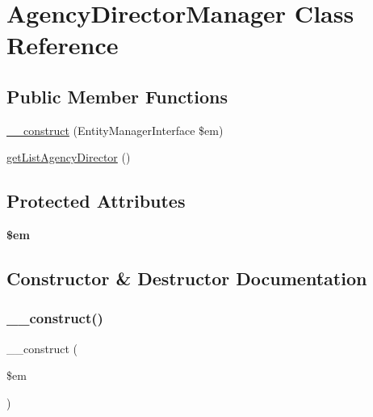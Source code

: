 \hypertarget{class_app_1_1_b_l_1_1_agency_director_manager}{}\section{Agency\+Director\+Manager Class Reference}
\label{class_app_1_1_b_l_1_1_agency_director_manager}
\subsection*{Public Member Functions}
\begin{DoxyCompactItemize}
\item 
\mbox{\hyperlink{class_app_1_1_b_l_1_1_agency_director_manager_a25f4258aeb5ce2a61a2504cb7c058485}{\+\_\+\+\_\+construct}} (Entity\+Manager\+Interface \$em)
\item 
\mbox{\hyperlink{class_app_1_1_b_l_1_1_agency_director_manager_a267bd33e4c994768e98c18ff7ace416e}{get\+List\+Agency\+Director}} ()
\end{DoxyCompactItemize}
\subsection*{Protected Attributes}
\begin{DoxyCompactItemize}
\item 
\mbox{\label{class_app_1_1_b_l_1_1_agency_director_manager_a0f2991d5fed029ef50ef619f1a532d06}} 
{\bfseries \$em}
\end{DoxyCompactItemize}


\subsection{Constructor \& Destructor Documentation}
\mbox{\label{class_app_1_1_b_l_1_1_agency_director_manager_a25f4258aeb5ce2a61a2504cb7c058485}} 
\subsubsection{\texorpdfstring{\_\_construct()}{\_\_construct()}}
{\footnotesize\ttfamily \+\_\+\+\_\+construct (\begin{DoxyParamCaption}\item[{Entity\+Manager\+Interface}]{\$em }\end{DoxyParamCaption})}

